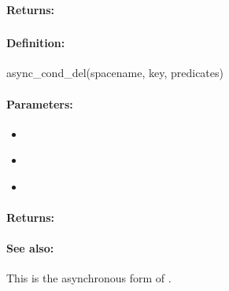 \paragraph{Returns:}


\pagebreak
\subsubsection{}
\label{api:ruby:async_cond_del}


\paragraph{Definition:}
\begin{rubycode}
async_cond_del(spacename, key, predicates)
\end{rubycode}

\paragraph{Parameters:}
\begin{itemize}[noitemsep]
\item {}\\

\item {}\\

\item {}\\

\end{itemize}

\paragraph{Returns:}


\paragraph{See also:}  This is the asynchronous form of .

\pagebreak
\subsubsection{}
\label{api:ruby:group_del}


